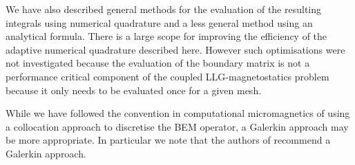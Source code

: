 We have also described general methods for the evaluation of the resulting integrals using numerical quadrature and a less general method using an analytical formula.
There is a large scope for improving the efficiency of the adaptive numerical quadrature described here.
However such optimisations were not investigated because the evaluation of the boundary matrix is not a performance critical component of the coupled LLG-magnetostatics problem because it only needs to be evaluated once for a given mesh.

While we have followed the convention in computational micromagnetics of using a collocation approach to discretise the BEM operator, a Galerkin approach may be more appropriate.
In particular we note that the authors of \hlib recommend a Galerkin approach.

